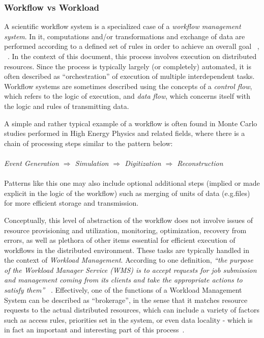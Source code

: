 \subsubsection{Workflow vs Workload}

A scientific workflow system is a specialized case of a \textit{workflow management system}. In it, computations and/or transformations and exchange of data are performed according to a defined set of rules
in order to achieve an overall goal ~\cite{grid_workflow_taxonomy}, ~\cite{grid_workflow_fit}. In the context of this document, this process involves execution on distributed resources. Since the process is
typically largely (or completely) automated, it is often described as ``orchestration'' of execution of multiple interdependent tasks. Workflow systems are sometimes described using the concepts of a \textit{control flow},
which refers to the logic of execution, and \textit{data flow}, which concerns itself with the logic and rules of transmitting data.

A simple and rather typical example of a workflow is often found in Monte Carlo studies performed in High Energy Physics and related fields, where there is a chain of processing steps similar to the pattern below:
\\
\\
\textit{Event  Generation $\Longrightarrow$ Simulation $\Longrightarrow$ Digitization $\Longrightarrow$ Reconstruction}
\\
\\
Patterns like this one may also include optional additional steps (implied or made explicit in the logic of the workflow) such as merging of units of data (e.g.files) for more efficient storage and transmission.

Conceptually, this level of abstraction of the workflow does not  involve issues of resource provisioning and utilization, monitoring, optimization, recovery from errors, as well as plethora of other items essential
for efficient execution of workflows in the distributed environment. These tasks are typically handled in the context of \textit{Workload Management}. According to one definition,
\textit{``the purpose of the Workload Manager Service (WMS) is to accept requests for job submission and management coming from its clients and take the appropriate actions to satisfy them''} ~\cite{egee_user_guide}.
Effectively, one of the functions of a Workload Management System can be described as ``brokerage'', in the sense that it matches resource requests to the actual distributed resources, which can include a
variety of factors such as access rules, priorities set in the system, or even data locality - which is in fact an important and interesting part of this process~\cite{panda_chep11}.

